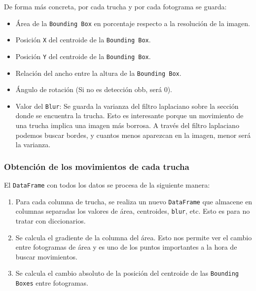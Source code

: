 \clearpage

De forma más concreta, por cada trucha y por cada fotograma se guarda:
\begin{itemize}
    \item Área de la \texttt{Bounding Box} en porcentaje respecto a la resolución de la imagen.
    \item Posición \texttt{X} del centroide de la \texttt{Bounding Box}.
    \item Posición \texttt{Y} del centroide de la \texttt{Bounding Box}.
    \item Relación del ancho entre la altura de la \texttt{Bounding Box}.
    \item Ángulo de rotación (Si no es detección \acrshort{obb}, será 0).
    \item Valor del \texttt{Blur}: Se guarda la varianza del filtro laplaciano sobre la sección donde se encuentra la trucha. Esto es interesante porque un movimiento de una trucha implica una imagen más borrosa. A través 
    del filtro laplaciano podemos buscar bordes, y cuantos menos aparezcan en la imagen, menor será la varianza.
\end{itemize}

\subsubsection{Obtención de los movimientos de cada trucha}

El \texttt{DataFrame} con todos los datos se procesa de la siguiente manera:
\begin{enumerate}
    \item Para cada columna de trucha, se realiza un nuevo \texttt{DataFrame} que almacene en columnas separadas los valores de área, centroides, \texttt{blur}, etc. Esto es para no tratar con diccionarios.
    \item Se calcula el gradiente de la columna del área. Esto nos permite ver el cambio entre fotogramas de área y es uno de los puntos importantes a la hora de buscar movimientos.
    \item Se calcula el cambio absoluto de la posición del centroide de las \texttt{Bounding Boxes} entre fotogramas.
\end{enumerate}

